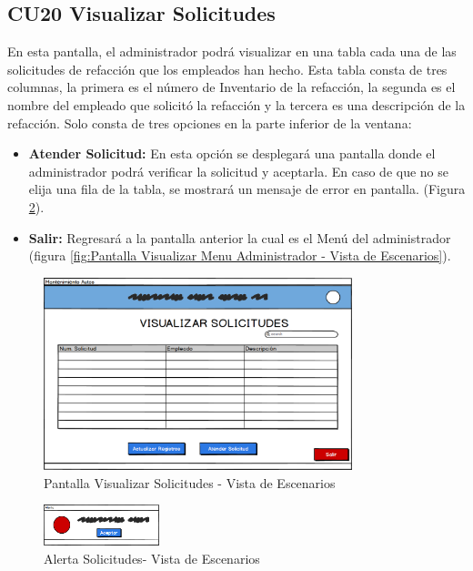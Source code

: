 \subsection{CU20 Visualizar Solicitudes}
En esta pantalla, el administrador podrá visualizar en una tabla cada una de las solicitudes de refacción que los empleados han hecho. Esta tabla consta de tres columnas, la primera es el número de Inventario de la refacción, la segunda es el nombre del empleado que solicitó la refacción y la tercera es una descripción de la refacción. Solo consta de tres opciones en la parte inferior de la ventana:
\begin{itemize}
	
	\item \textbf{Atender Solicitud:} En esta opción se desplegará una pantalla donde el administrador podrá verificar la solicitud y aceptarla. En caso de que no se elija una fila de la tabla, se mostrará un mensaje de error en pantalla. (Figura \ref{fig:Alerta Solicitudes - Vista de Escenarios}).
	\item \textbf{Salir:} Regresará a la pantalla anterior la cual es el Menú del administrador (figura \ref{fig:Pantalla Visualizar Menu Administrador - Vista de Escenarios}).
\end{itemize}
\begin{figure}[!h]
	\centering
	\includegraphics[width=0.8\textwidth]{./diseno/vescenarios/imagenes/visualizarSolicitudes}
	\caption{Pantalla Visualizar Solicitudes - Vista de Escenarios}
	\label{fig:Pantalla Visualizar Solicitudes- Vista de Escenarios}
\end{figure}
\begin{figure}[!h]
	\centering
	\includegraphics[width=0.3\textwidth]{./diseno/vescenarios/imagenes/alerta}
	\caption{Alerta Solicitudes- Vista de Escenarios}
	\label{fig:Alerta Solicitudes - Vista de Escenarios}
\end{figure}
\clearpage